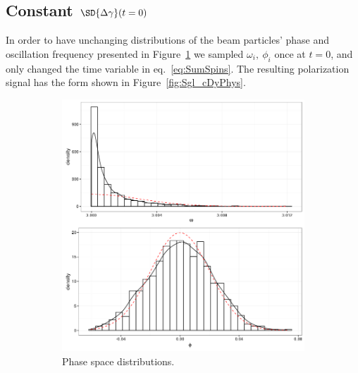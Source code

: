 \documentclass{article}
\begin{document}
\subsection{Constant $\SD{\dy}(t=0)$}
In order to have unchanging distributions of the beam particles' phase and oscillation frequency presented in Figure~\ref{fig:PSdist_cDy} we sampled $\omega_i,~\phi_i$ once at $t=0$, and only changed the time variable in eq.~\eqref{eq:SumSpins}. The resulting polarization signal has the form shown in Figure~\ref{fig:Sgl_cDyPhys}.
\begin{figure}[h]
	\begin{subfigure}[b]{.45\textwidth}
		\centering
		\includegraphics[scale=.5]{../img/PS_dist}
		\caption{Phase space distributions.\label{fig:PSdist_cDy}}
	\end{subfigure}~~~~~~~~
	\begin{subfigure}[b]{.45\textwidth}
		\centering

\end{subfigure}
\end{figure}
\end{document}
